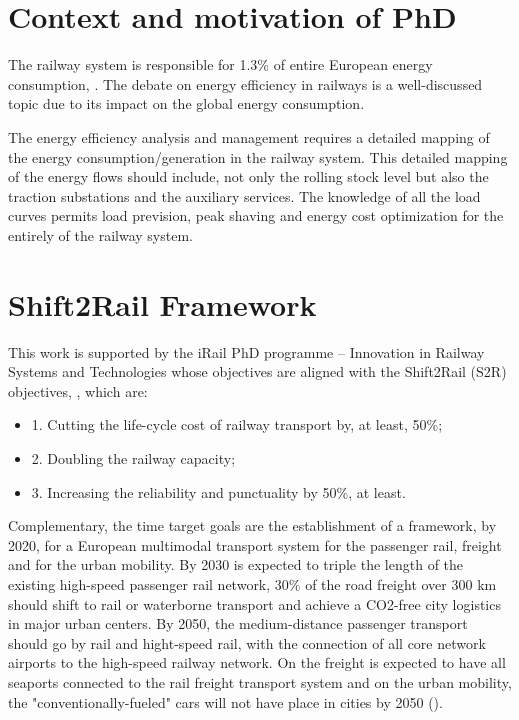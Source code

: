 
\section{Context and motivation of PhD}

The railway system is responsible for 1.3\% of entire European energy consumption, \cite{iea-uic2016}. 
The debate on energy efficiency in railways is a well-discussed topic due to its impact on the global energy consumption.

The energy efficiency analysis and management requires a detailed mapping of the energy consumption/generation in the railway system. 
This detailed mapping of the energy flows should include, not only the rolling stock level but also the traction substations and the auxiliary services.
The knowledge of all the load curves permits load prevision, peak shaving and energy cost optimization for the entirely of the railway system.


\section{Shift2Rail Framework}

This work is supported by the iRail PhD programme – Innovation in Railway Systems and Technologies whose objectives are aligned with the Shift2Rail (S2R) objectives, \cite{shift2rail2015}, which are: 

\begin{itemize}
	\setlength\itemsep{-0.5em}
	\item 1. Cutting the life-cycle cost of railway transport by, at least, 50\%;
	\item 2. Doubling the railway capacity;
	\item 3. Increasing the reliability and punctuality by 50\%, at least.
\end{itemize}

Complementary, the time target goals are the establishment of a framework, by 2020, for a European multimodal transport system for the passenger rail, freight and for the urban mobility. By 2030 is expected to triple the length of the existing high-speed passenger rail network, 30\% of the road freight over 300 km should shift to rail or waterborne transport and achieve a CO2-free city logistics in major urban centers. By 2050, the medium-distance passenger transport should go by rail and hight-speed rail, with the connection of all core network airports to the high-speed railway network. On the freight is expected to have all seaports connected to the rail freight transport system and on the urban mobility, the "conventionally-fueled" cars will not have place in cities by 2050 (\cite{shift2rail2015}).


